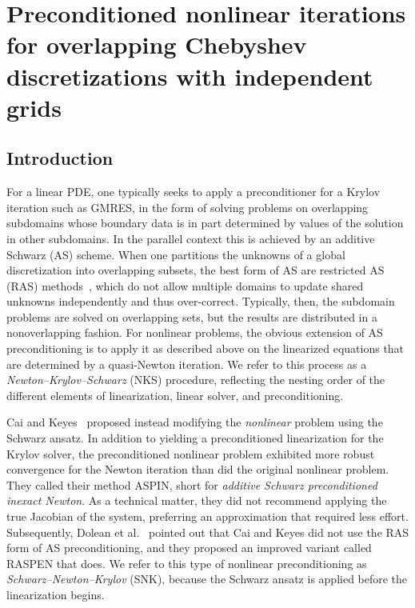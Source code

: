 \chapter{Preconditioned nonlinear iterations for overlapping Chebyshev discretizations with independent grids}
\label{snk_chap}
\section{Introduction}
\label{sec:introduction}


For a linear PDE, one typically seeks to apply a preconditioner for a Krylov iteration such as GMRES, in the form of solving problems on overlapping subdomains whose boundary data is in part determined by values of the solution in other subdomains. In the parallel context this is achieved by an additive Schwarz (AS) scheme. When one partitions the unknowns of a global discretization into overlapping subsets, the best form of AS are restricted AS (RAS) methods~\cite{Cai1999}, which do not allow multiple domains to update shared unknowns independently and thus over-correct. Typically, then, the subdomain problems are solved on overlapping sets, but the results are distributed in a nonoverlapping fashion. 
%
For nonlinear problems, the obvious extension of AS preconditioning is to apply it as described above on the linearized equations that are determined by a quasi-Newton iteration. We refer to this process as a \emph{Newton--Krylov--Schwarz} (NKS) procedure, reflecting the nesting order of the different elements of linearization, linear solver, and preconditioning.

Cai and Keyes~\cite{Cai2002} proposed instead modifying the \emph{nonlinear} problem using the Schwarz ansatz. In addition to yielding a preconditioned linearization for the Krylov solver, the preconditioned nonlinear problem exhibited more robust convergence for the Newton iteration than did the original nonlinear problem. They called their method ASPIN, short for \textit{additive Schwarz preconditioned inexact Newton}. As a technical matter, they did not recommend applying the true Jacobian of the system, preferring an approximation that required less effort. Subsequently, Dolean et al.~\cite{Dolean2016} pointed out that Cai and Keyes did not use the RAS form of AS preconditioning, and they proposed an improved variant called RASPEN that does. We refer to this type of nonlinear preconditioning as \emph{Schwarz--Newton--Krylov} (SNK), because the Schwarz ansatz is applied before the linearization begins.

